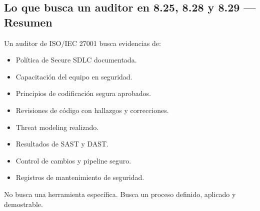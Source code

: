 \subsection{Lo que busca un auditor en 8.25, 8.28 y 8.29 --- Resumen}

Un auditor de ISO/IEC 27001 busca evidencias de:

\begin{itemize}
    \item Política de Secure SDLC documentada.
    \item Capacitación del equipo en seguridad.
    \item Principios de codificación segura aprobados.
    \item Revisiones de código con hallazgos y correcciones.
    \item Threat modeling realizado.
    \item Resultados de SAST y DAST.
    \item Control de cambios y pipeline seguro.
    \item Registros de mantenimiento de seguridad.
\end{itemize}

No busca una herramienta específica. Busca un proceso definido, aplicado y demostrable.
